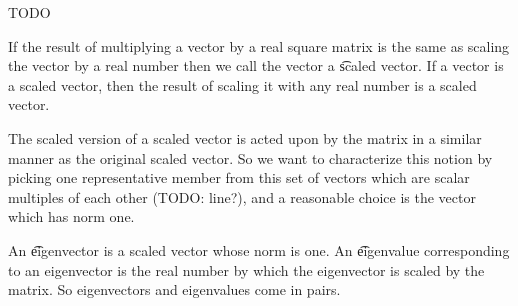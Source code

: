 

TODO


If the result of multiplying a vector by a real square matrix is the same as scaling the vector by a real number then we call the vector a \t{scaled vector}.
If a vector is a scaled vector, then the result of scaling it with any real number is a scaled vector.

The scaled version of a scaled vector is acted upon by the matrix in a similar manner as the original scaled vector.
So we want to characterize this notion by picking one representative member from this set of vectors which are scalar multiples of each other (TODO: line?), and a reasonable choice is the vector which has norm one.

An \t{eigenvector} is a scaled vector whose norm is one.
An \t{eigenvalue} corresponding to an eigenvector is the real number by which the eigenvector is scaled by the matrix.
So eigenvectors and eigenvalues come in pairs.
